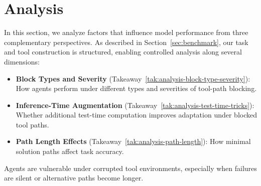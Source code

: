 \section{Analysis}
\label{sec:analysis}

In this section, we analyze factors that influence model performance from three complementary
perspectives. As described in Section~\ref{sec:benchmark}, our task and tool construction is 
structured, enabling controlled analysis along several dimensions:
\begin{itemize}[topsep=2pt, partopsep=3pt, leftmargin=*, itemsep=-3pt]
    \item \textbf{Block Types and Severity} (Takeaway~\ref{tak:analysis-block-type-severity}):
    How agents perform under different types and severities of tool-path blocking.

    \item \textbf{Inference-Time Augmentation} (Takeaway~\ref{tak:analysis-test-time-tricks}):
    Whether additional test-time computation improves adaptation under blocked tool paths.

    \item \textbf{Path Length Effects} (Takeaway~\ref{tak:analysis-path-length}):
    How minimal solution paths affect task accuracy.
\end{itemize}










\begin{takeaway}[label={tak:analysis-block-type-severity}]
Agents are vulnerable under corrupted tool environments, especially when failures are silent or alternative paths become longer.
\end{takeaway}

